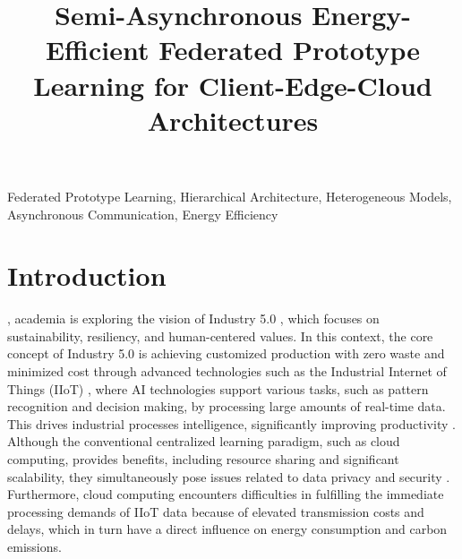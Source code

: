 \documentclass[journal]{IEEEtran}
\begin{document}
\title{Semi-Asynchronous Energy-Efficient Federated Prototype Learning for Client-Edge-Cloud Architectures}




\maketitle

\begin{abstract}

\end{abstract}

\begin{IEEEkeywords}
  Federated Prototype Learning, Hierarchical Architecture, Heterogeneous Models, Asynchronous Communication, Energy Efficiency
\end{IEEEkeywords}

\section{Introduction}
, academia is exploring the vision of Industry 5.0 \cite{zeb2024towards_industry5.0, leng2024unlocking_industry5.0}, which focuses on sustainability, resiliency, and human-centered values. In this context, the core concept of Industry 5.0 is achieving customized production with zero waste and minimized cost through advanced technologies such as the Industrial Internet of Things (IIoT) \cite{zeb2024towards_industry5.0,10440434}, where AI technologies support various tasks, such as pattern recognition and decision making, by processing large amounts of real-time data. This drives industrial processes intelligence, significantly improving productivity \cite{liu2024federated_sensors, de2024spatio_agriculture}. Although the conventional centralized learning paradigm, such as cloud computing, provides benefits, including resource sharing and significant scalability, they simultaneously pose issues related to data privacy and security \cite{boobalan2022fusion}. Furthermore, cloud computing encounters difficulties in fulfilling the immediate processing demands of IIoT data because of elevated transmission costs and delays, which in turn have a direct influence on energy consumption and carbon emissions.
\end{document}
